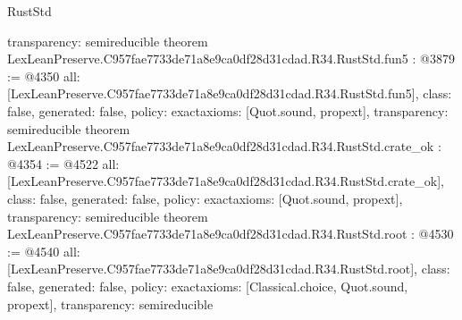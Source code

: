 \begin{lexlean}{RustStd}
\begin{coremodule}
{  transparency: semireducible
}
theorem LexLeanPreserve.C957fae7733de71a8e9ca0df28d31cdad.R34.RustStd.fun5 : @3879 := @4350 {
  all: [LexLeanPreserve.C957fae7733de71a8e9ca0df28d31cdad.R34.RustStd.fun5],
  class: false,
  generated: false,
  policy: exact{axioms: [Quot.sound, propext]},
  transparency: semireducible
}
theorem LexLeanPreserve.C957fae7733de71a8e9ca0df28d31cdad.R34.RustStd.crate_ok : @4354 := @4522 {
  all: [LexLeanPreserve.C957fae7733de71a8e9ca0df28d31cdad.R34.RustStd.crate_ok],
  class: false,
  generated: false,
  policy: exact{axioms: [Quot.sound, propext]},
  transparency: semireducible
}
theorem LexLeanPreserve.C957fae7733de71a8e9ca0df28d31cdad.R34.RustStd.root : @4530 := @4540 {
  all: [LexLeanPreserve.C957fae7733de71a8e9ca0df28d31cdad.R34.RustStd.root],
  class: false,
  generated: false,
  policy: exact{axioms: [Classical.choice, Quot.sound, propext]},
  transparency: semireducible
}


\end{coremodule}
\end{lexlean}
